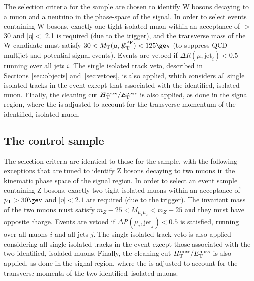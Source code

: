 The selection criteria for the \mj sample are chosen to identify W
bosons decaying to a muon and a neutrino in the phase-space of the
signal. In order to select events containing W bosons, exactly one
tight isolated muon within an acceptance of \PT $>$ 30 \gev and
$|\eta| <$ 2.1 is required (due to the trigger), and the transverse
mass of the W candidate must satisfy $30 < \mt(\mu,\pfmet) < 125\gev$
(to suppress QCD multijet and potential signal events). Events are
vetoed if $\Delta R(\mu,\textrm{jet}_i) < 0.5$ running over all jets
$i$. The single isolated track veto, described in
Sections~\ref{sec:objects} and~\ref{sec:vetoes}, is also applied,
which considers all single isolated tracks in the event except that
associated with the identified, isolated muon. Finally, the cleaning
cut $\mbox{$H_{\rm T}^{\rm miss}$}/\mbox{$E_\text{T}^{\rm miss}$}$ is also applied, as done in the signal region, where
the \met is adjusted to account for the transverse momentum of the
identified, isolated muon.

\subsection{The \texorpdfstring{\mmj}{di-muon plus jets} control sample}


The selection criteria are identical to those for the \mj sample, with
the following exceptions that are tuned to identify Z bosons decaying
to two muons in the kinematic phase space of the signal region. 
In order to select an event sample containing Z bosons, exactly two
tight isolated muons within an acceptance of $\Pt > 30\gev$ and
$|\eta| < 2.1$ are required (due to the trigger). The invariant mass
of the two muons must satisfy $m_{Z} - 25 < M_{\mu_1\mu_2} < m_{Z} +
25$ and they must have opposite charge. Events are vetoed if $\Delta
R(\mu_{i},\textrm{jet}_j) < 0.5$ is satisfied, running over all muons
$i$ and all jets $j$. The single isolated track veto is also applied
considering all single isolated tracks in the event except those
associated with the two identified, isolated muons. Finally, the
cleaning cut $\mbox{$H_{\rm T}^{\rm miss}$}/\mbox{$E_\text{T}^{\rm miss}$}$ is also applied, as done in the signal
region, where the \met is adjusted to account for the transverse
momenta of the two identified, isolated muons. 

